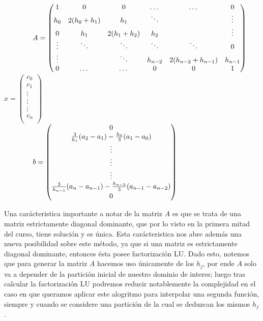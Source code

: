 \vspace{4mm}
\begin{center}
$
\hspace{1.4cm}
A =
     \begin{pmatrix}
      1 & 0 & 0 & \dots & \dots & 0 \\
	  h_0 & 2(h_0 + h_1) & h_1 & \ddots &  & \vdots \\
	  0 & h_1 & 2(h_1 + h_2) & h_2 &  & \vdots \\
	  \vdots & \ddots & \ddots & \ddots & \ddots & 0\\
	  \vdots & & \ddots & h_{n-2} & 2(h_{n-2} + h_{n-1}) & h_{n-1} \\
	  0  & \dots & \dots & 0 & 0 & 1 \\
     \end{pmatrix}
$
\vspace{4mm}
$   
x =
     \begin{pmatrix}
      c_0 \\
	  c_1 \\
	  \vdots \\
	  \vdots \\
	  \vdots \\
	  c_n \\
     \end{pmatrix}
$
\\
$
\hspace{1.4cm}
b =
     \begin{pmatrix}
      0 \\
	  \frac{3}{h_1}(a_2 - a_1) - \frac{h_0}{3}(a_1 - a_0) \\
	  \vdots \\
	  \vdots \\
	  \vdots \\
	  \frac{3}{h_{n-1}}(a_n - a_{n-1}) - \frac{h_{n-2}}{3}(a_{n-1} - a_{n-2}) \\
	  0 \\
     \end{pmatrix}
$
\end{center}
\vspace{4mm}

Una carácteristica importante a notar de la matriz $A$ es que se trata de una matriz estrictamente diagonal dominante, que por lo visto en la primera mitad del curso, tiene solución y es única. Esta carácteristica nos abre además una nueva posibilidad sobre este método, ya que si una matriz es estrictamente diagonal dominante, entonces ésta posee factorización LU. Dado esto, notemos que para generar la matriz $A$ hacemos uso únicamente de los $h_j$, por ende $A$ solo va a depender de la partición inicial de nuestro dominio de interes; luego tras calcular la factorización LU podremos reducir notablemente la complejidad en el caso en que queramos aplicar este alogritmo para interpolar una segunda función, siempre y cuando se considere una partición de la cual se deduzcan los mismos $h_j$.
\vspace{4mm}

